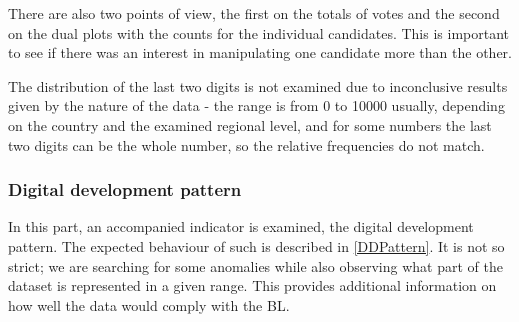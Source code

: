 There are also two points of view, the first on the totals of votes and the second on the dual plots with the counts for the individual candidates. This is important to see if there was an interest in manipulating one candidate more than the other. 

The distribution of the last two digits is not examined due to inconclusive results given by the nature of the data - the range is from 0 to 10000 usually, depending on the country and the examined regional level, and for some numbers the last two digits can be the whole number, so the relative frequencies do not match. 

\subsubsection{Digital development pattern} 

In this part, an accompanied indicator is examined, the digital development pattern. The expected behaviour of such is described in \ref{DDPattern}. It is not so strict; we are searching for some anomalies while also observing what part of the dataset is represented in a given range. This provides additional information on how well the data would comply with the BL. 



